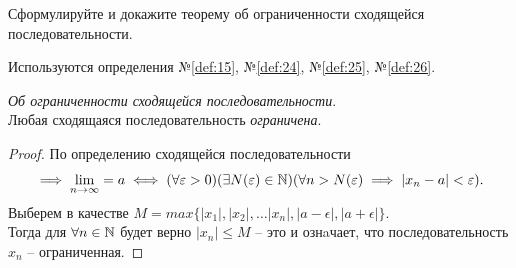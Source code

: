 \begin{question}
    Сформулируйте и докажите теорему об ограниченности сходящейся последовательности.
\end{question}
\begin{used}
    Используются определения №\ref{def:15}, №\ref{def:24}, №\ref{def:25}, №\ref{def:26}.
\end{used}
\begin{theorem}
  \textit{Об ограниченности сходящейся последовательности}. \\ 
  Любая сходящаяся последовательность \textit{ограничена}. 
\end{theorem}
\begin{proof}
    По определению сходящейся последовательности 
    \begin{gather*}
        \implies \lim_{n \to \infty} = a \iff (\forall \varepsilon > 0)(\exists N(\varepsilon)\in \mathbb{N})(\forall n > N(\varepsilon) \implies |x_{n} - a| < \varepsilon).
    \end{gather*}
    Выберем в качестве $M = max \{|x_{1}|, |x_2|, \ldots |x_n|, |a - \epsilon|, |a + \epsilon|\}$. \\
    Тогда для $\forall n \in \mathbb{N}$ будет верно $|x_{n}| \le M$ -- это и ознaчает, что последовательность $x_{n}$ -- ограниченная.
\end{proof}
\pagebreak




